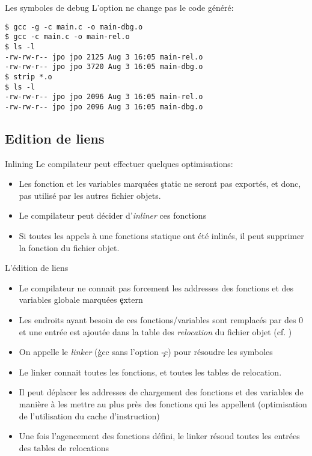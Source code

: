 \begin{frame}[fragile=singleslide]{Les symboles de debug}
  L'option  ne change pas le code généré:
  \begin{lstlisting}
$ gcc -g -c main.c -o main-dbg.o
$ gcc -c main.c -o main-rel.o
$ ls -l
-rw-rw-r-- jpo jpo 2125 Aug 3 16:05 main-rel.o
-rw-rw-r-- jpo jpo 3720 Aug 3 16:05 main-dbg.o
$ strip *.o
$ ls -l
-rw-rw-r-- jpo jpo 2096 Aug 3 16:05 main-rel.o
-rw-rw-r-- jpo jpo 2096 Aug 3 16:05 main-dbg.o
  \end{lstlisting}
\end{frame}


\subsection{Edition de liens}

\begin{frame}[fragile=singleslide]{Inlining}
  Le compilateur peut effectuer quelques optimisations:
  \begin{itemize}
  \item Les  fonction et les  variables marquées \c{static}  ne seront
    pas exportés, et donc, pas utilisé par les autres fichier objets.
  \item  Le compilateur peut décider d'\emph{inliner} ces fonctions
  \item Si toutes les appels à une fonctions statique ont été inlinés,
    il peut supprimer la fonction du fichier objet.
  \end{itemize}
\end{frame}

\begin{frame}[fragile=singleslide]{L'édition de liens}
  \begin{itemize}
  \item  Le compilateur  ne connait  pas forcement  les  addresses des
    fonctions et des variables globale marquées \c{extern}
  \item  Les endroits  ayant  besoin de  ces fonctions/variables  sont
    remplacés par  des 0 et une  entrée est ajoutée dans  la table des
    \emph{relocation} du fichier objet (cf. )
  \item  On appelle  le \emph{linker}  (\c{gcc} sans  l'option \c{-c})
    pour résoudre les symboles
  \item Le linker  connait toutes les fonctions, et  toutes les tables
    de relocation.
  \item Il peut déplacer les  addresses de chargement des fonctions et
    des variables de  manière à les mettre au  plus près des fonctions
    qui  les   appellent  (optimisation  de   l'utilisation  du  cache
    d'instruction)
  \item Une  fois l'agencement des fonctions défini,  le linker résoud
    toutes les entrées des tables de relocations
  \end{itemize}
\end{frame}

